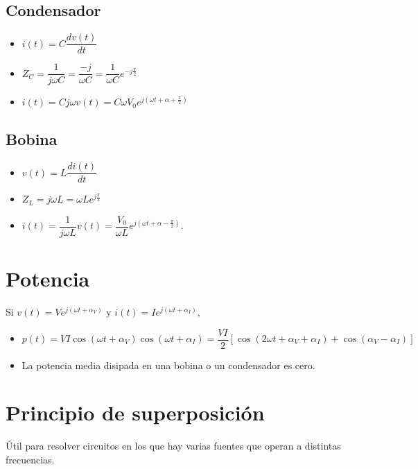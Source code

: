 \documentclass[10pt,a4paper]{article}
\begin{document}
	\subsection{Condensador}
	
	\begin{itemize}
		\item $i(t) = C \dfrac{dv(t)}{dt}$
		\item $Z_C = \dfrac{1}{j\omega C} = \dfrac{-j}{\omega C} = \dfrac{1}{\omega C} e^{-j\tfrac{\pi}{2}}$
		\item $i(t) = Cj\omega v(t) = C \omega V_0 e^{j(\omega t + \alpha + \tfrac{\pi}{2})}$
	\end{itemize}

	\subsection{Bobina}
	
	\begin{itemize}
		\item $v(t) = L \dfrac{d i(t)}{dt}$
		\item $Z_L = j \omega L = \omega L e ^{j \tfrac{\pi}{2}}$
		\item $i(t) = \dfrac{1}{j \omega L}v(t) = \dfrac{V_0}{\omega L}e^{j(\omega t + \alpha - \tfrac{\pi}{2})}$.
	\end{itemize}
	
	\section{Potencia}
	
	Si $v(t) = V e^{j(\omega t + \alpha_V)}$ y $i(t) = I e^{j(\omega t + \alpha_I)}$,
	
	\begin{itemize}
		\item $p(t) = VI \cos(\omega t + \alpha_V)\cos(\omega t + \alpha_I) = \dfrac{VI}{2}[\cos(2\omega t + \alpha_V + \alpha_I)+ \cos(\alpha_V - \alpha_I)]$
		\item La potencia media disipada en una bobina o un condensador es cero.
	\end{itemize}

	\section{Principio de superposición}
	
	Útil para resolver circuitos en los que hay varias fuentes que operan a distintas frecuencias.
	
\end{document}

